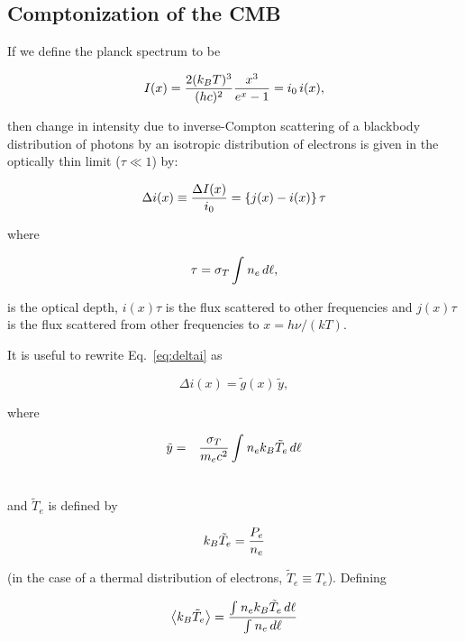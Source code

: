 \subsection{Comptonization of the CMB}

If we define the planck spectrum to be

\begin{equation}
I(x) = {{2(k_B T)^3}\over{(hc)^2}}{{x^3}\over{e^x - 1}} = i_0\,i(x), 
\end{equation}

then change in intensity due to inverse-Compton scattering of a
blackbody distribution of photons by an isotropic distribution of
electrons is given in the optically thin limit ($\tau \ll 1$) by:

\begin{equation}
\Delta i(x) \equiv {\Delta I(x)\over{i_0}} = \left\{j(x) - i(x)\right\}\tau
\label{eq:deltai}
\end{equation}

where

\begin{equation}
\tau = \sigma_T\int^{}_{}{n_e\,d\ell},
\end{equation}

is the optical depth, $i(x)\tau$ is the flux scattered to other frequencies and
$j(x)\tau$ is the flux scattered from other frequencies to $x =
h\nu/(kT)$. 

It is useful to rewrite Eq.~\ref{eq:deltai} as

\begin{equation}
\Delta i(x) = \tilde{g}(x)\,\tilde{y},
\end{equation}

where

\begin{eqnarray}\nonumber
\tilde{y} &=& {{\sigma_T}\over{m_e c^2}}\int^{}_{}{n_e k_B \tilde{T}_e\,d\ell}\\\nonumber
\end{eqnarray}

and $\tilde{T}_e$ is defined by 

\begin{equation}
k_B\tilde{T}_e = {{P_e}\over{n_e}}
\end{equation}

(in the case of a thermal distribution of electrons, $\tilde{T}_e \equiv T_e$).  Defining 

\begin{equation}
\left<k_B\tilde{T}_e\right> = {{\int^{}_{}{n_ek_B\tilde{T}_e\,d\ell}}\over{\int^{}_{}{n_e\,d\ell}}}
\end{equation}


